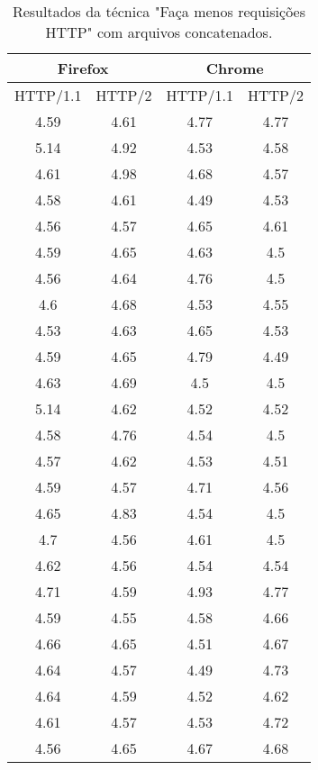 \begin{table}[H]
	\centering
	\caption{Resultados da técnica "Faça menos requisições HTTP" com arquivos concatenados.}
	\label{resultados-facamenosrequisicoeshttp-concatenados}
	\begin{tabular}{cccc}
		\hline
		\multicolumn{2}{c}{\textbf{Firefox}} & \multicolumn{2}{c}{\textbf{Chrome}} \\
		\hline
		HTTP/1.1 & HTTP/2 & HTTP/1.1 & HTTP/2 \\
		\hline
		4.59 & 4.61 & 4.77 & 4.77 \\
		5.14 & 4.92 & 4.53 & 4.58 \\
		4.61 & 4.98 & 4.68 & 4.57 \\
		4.58 & 4.61 & 4.49 & 4.53 \\
		4.56 & 4.57 & 4.65 & 4.61 \\
		4.59 & 4.65 & 4.63 & 4.5  \\
		4.56 & 4.64 & 4.76 & 4.5  \\
		4.6  & 4.68 & 4.53 & 4.55 \\
		4.53 & 4.63 & 4.65 & 4.53 \\
		4.59 & 4.65 & 4.79 & 4.49 \\
		4.63 & 4.69 & 4.5  & 4.5  \\
		5.14 & 4.62 & 4.52 & 4.52 \\
		4.58 & 4.76 & 4.54 & 4.5  \\
		4.57 & 4.62 & 4.53 & 4.51 \\
		4.59 & 4.57 & 4.71 & 4.56 \\
		4.65 & 4.83 & 4.54 & 4.5  \\
		4.7  & 4.56 & 4.61 & 4.5  \\
		4.62 & 4.56 & 4.54 & 4.54 \\
		4.71 & 4.59 & 4.93 & 4.77 \\
		4.59 & 4.55 & 4.58 & 4.66 \\
		4.66 & 4.65 & 4.51 & 4.67 \\
		4.64 & 4.57 & 4.49 & 4.73 \\
		4.64 & 4.59 & 4.52 & 4.62 \\
		4.61 & 4.57 & 4.53 & 4.72 \\
		4.56 & 4.65 & 4.67 & 4.68 \\
		\hline
	\end{tabular}
\end{table}